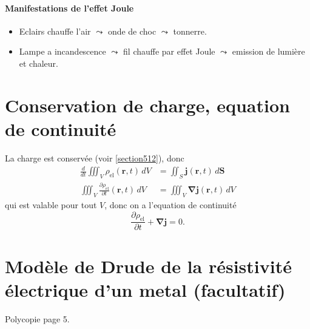 \paragraph{Manifestations de l'effet Joule}
\begin{itemize}
\item Eclairs chauffe l'air $\leadsto$ onde de choc $\leadsto$ tonnerre.
\item Lampe a incandescence $\leadsto$ fil chauffe par effet Joule $\leadsto$ emission de lumière et chaleur.
\end{itemize}
\section{Conservation de charge, equation de continuité}
La charge est conservée (voir \ref{section512}), donc 
\begin{align*}
\frac{d}{dt}\iiint _{V}\rho _{\mathrm{el}}(\boldsymbol{r},t)\,dV & =\iint _{S}\boldsymbol{j}(\boldsymbol{r},t)\,d\boldsymbol{S} \\
 \iiint _{V}\frac{ \partial \rho _{\mathrm{el}} }{ \partial t } (\boldsymbol{r},t)\,dV & =\iiint _{V}\boldsymbol{\nabla j}(\boldsymbol{r},t)\,dV
\end{align*} 
qui est valable pour tout $V$, donc on a l'equation de continuité 
$$
\frac{ \partial \rho _{\mathrm{el}} }{ \partial t } +\boldsymbol{\nabla j}=0.
$$
\section{Modèle de Drude de la résistivité électrique d'un metal (facultatif)}
Polycopie page 5.
